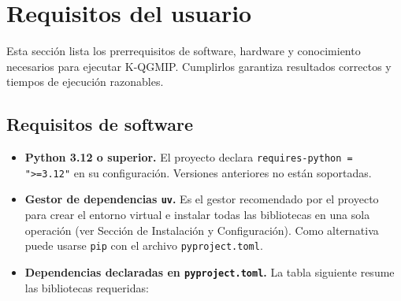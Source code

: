 
\section{Requisitos del usuario}
\label{sec:requisitos}

Esta sección lista los prerrequisitos de software, hardware y conocimiento necesarios para
ejecutar K-QGMIP. Cumplirlos garantiza resultados correctos y tiempos de ejecución razonables.

\subsection{Requisitos de software}

\begin{itemize}
  \item \textbf{Python 3.12 o superior.} El proyecto declara
        \texttt{requires-python = ">=3.12"} en su configuración. Versiones anteriores no
        están soportadas.

  \item \textbf{Gestor de dependencias \texttt{uv}.} Es el gestor recomendado por el proyecto
        para crear el entorno virtual e instalar todas las bibliotecas en una sola operación
        (ver Sección de Instalación y Configuración). Como alternativa puede usarse \texttt{pip}
        con el archivo \texttt{pyproject.toml}.

  \item \textbf{Dependencias declaradas en \texttt{pyproject.toml}.} La tabla siguiente
        resume las bibliotecas requeridas:
\end{itemize}

